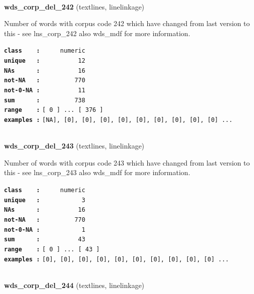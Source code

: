 \documentclass[]{article}
\begin{document}
~

\textbf{wds\_corp\_del\_242} (textlines, linelinkage)

Number of words with corpus code 242 which have changed from last
version to this - see lns\_corp\_242 also wds\_mdf for more information.

\textbf{\texttt{class\ \ \ \ :}} \texttt{~~~~~numeric}\\
\textbf{\texttt{unique\ \ \ :}} \texttt{~~~~~~~~~~12}\\
\textbf{\texttt{NAs\ \ \ \ \ \ :}} \texttt{~~~~~~~~~~16}\\
\textbf{\texttt{not-NA\ \ \ :}} \texttt{~~~~~~~~~770}\\
\textbf{\texttt{not-0-NA\ :}} \texttt{~~~~~~~~~~11}\\
\textbf{\texttt{sum\ \ \ \ \ \ :}} \texttt{~~~~~~~~~738}\\
\textbf{\texttt{range\ \ \ \ :}}
\texttt{{[}\ 0\ {]}\ ...\ {[}\ 376\ {]}}\\
\textbf{\texttt{examples\ :}}
\texttt{{[}NA{]},\ {[}0{]},\ {[}0{]},\ {[}0{]},\ {[}0{]},\ {[}0{]},\ {[}0{]},\ {[}0{]},\ {[}0{]},\ {[}0{]}\ ...}\\

~

\textbf{wds\_corp\_del\_243} (textlines, linelinkage)

Number of words with corpus code 243 which have changed from last
version to this - see lns\_corp\_243 also wds\_mdf for more information.

\textbf{\texttt{class\ \ \ \ :}} \texttt{~~~~~numeric}\\
\textbf{\texttt{unique\ \ \ :}} \texttt{~~~~~~~~~~~3}\\
\textbf{\texttt{NAs\ \ \ \ \ \ :}} \texttt{~~~~~~~~~~16}\\
\textbf{\texttt{not-NA\ \ \ :}} \texttt{~~~~~~~~~770}\\
\textbf{\texttt{not-0-NA\ :}} \texttt{~~~~~~~~~~~1}\\
\textbf{\texttt{sum\ \ \ \ \ \ :}} \texttt{~~~~~~~~~~43}\\
\textbf{\texttt{range\ \ \ \ :}}
\texttt{{[}\ 0\ {]}\ ...\ {[}\ 43\ {]}}\\
\textbf{\texttt{examples\ :}}
\texttt{{[}0{]},\ {[}0{]},\ {[}0{]},\ {[}0{]},\ {[}0{]},\ {[}0{]},\ {[}0{]},\ {[}0{]},\ {[}0{]},\ {[}0{]}\ ...}\\

~

\textbf{wds\_corp\_del\_244} (textlines, linelinkage)
\end{document}
